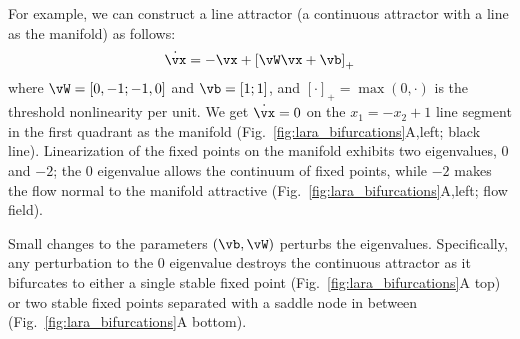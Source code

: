 \documentclass{article} %
\newcounter{ct}
\newcommand{\reals}{\mathbb{R}}
\theoremstyle{definition}
\theoremstyle{remark}
\begin{document}
For example, we can construct a line attractor (a continuous attractor with a line as the manifold) as follows:
\begin{align}\label{eq:TLN}
    \dot{\vx} = -\vx + \left[ \vW \vx + \vb \right]_{+}
\end{align}
where $\vW = [0, -1; -1, 0]$ and $\vb = [1; 1]$, and $[\cdot]_{+} = \max(0,\cdot)$ is the threshold nonlinearity per unit.
We get $\dot{\vx} = 0$ on the $x_1 = -x_2 + 1$ line segment in the first quadrant as the manifold (Fig.~\ref{fig:lara_bifurcations}A,left; black line).
Linearization of the fixed points on the manifold exhibits two eigenvalues, $0$ and $-2$;
the $0$ eigenvalue allows the continuum of fixed points, while $-2$ makes the flow normal to the manifold attractive (Fig.~\ref{fig:lara_bifurcations}A,left; flow field).

Small changes to the parameters $(\vb,\vW)$ perturbs the eigenvalues.
Specifically, any perturbation to the $0$ eigenvalue destroys the continuous attractor as it bifurcates to either
a single stable fixed point (Fig.~\ref{fig:lara_bifurcations}A top) or two stable fixed points separated with a saddle node in between (Fig.~\ref{fig:lara_bifurcations}A bottom).


\end{document}
